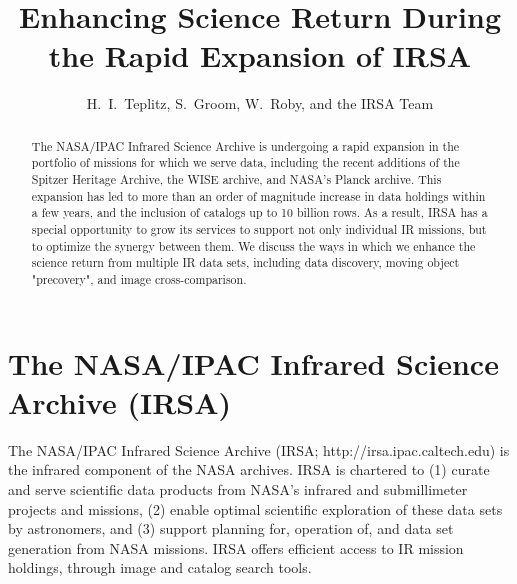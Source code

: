 
\resetcounters




\title{Enhancing Science Return During the Rapid Expansion of IRSA}
\author{H.~I.~Teplitz, S.~Groom, W.~Roby, and the IRSA Team
}


\begin{abstract}
  The NASA/IPAC Infrared Science Archive is undergoing a rapid expansion in the portfolio of missions for which we serve data, including the recent additions of the Spitzer Heritage Archive, the WISE archive, and NASA's Planck archive. This expansion has led to more than an order of magnitude increase in data holdings within a few years, and the inclusion of catalogs up to 10 billion rows. As a result, IRSA has a special opportunity to grow its services to support not only individual IR missions, but to optimize the synergy between them. We discuss the ways in which we enhance the science return from multiple IR data sets, including data discovery, moving object "precovery", and image cross-comparison.
\end{abstract}

\section{The NASA/IPAC Infrared Science Archive (IRSA)}

The NASA/IPAC Infrared Science Archive (IRSA; http://irsa.ipac.caltech.edu) is the infrared component of the NASA archives. IRSA is chartered to (1) curate and serve scientific data products from NASA’s infrared and submillimeter projects and missions, (2) enable optimal scientific exploration of these data sets by astronomers, and (3) support planning for, operation of, and data set generation from NASA missions. IRSA offers efficient access to IR mission holdings, through image and catalog search tools. 

